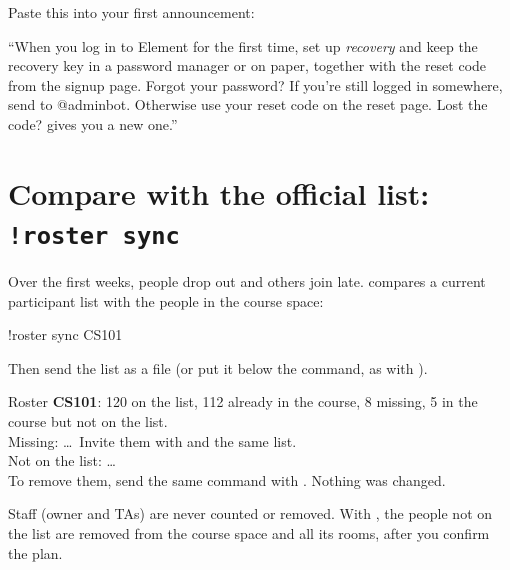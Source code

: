 \begin{tip}
Paste this into your first announcement:\par\smallskip
\enquote{When you log in to Element for the first time, set up \emph{recovery} and keep the
recovery key in a password manager or on paper, together with the reset code from the signup
page. Forgot your password? If you're still logged in somewhere, send  to
@adminbot. Otherwise use your reset code on the reset page. Lost the code?  gives you a new one.}
\end{tip}

\section{Compare with the official list: \texttt{!roster sync}}

Over the first weeks, people drop out and others join late.  compares a
current participant list with the people in the course space:

\begin{you}
!roster sync CS101
\end{you}

Then send the list as a file (or put it below the command, as with ).

\begin{botreply}
Roster \textbf{CS101}: 120 on the list, 112 already in the course, 8 missing, 5 in the course
but not on the list.\\
Missing: \dots\ Invite them with  and the same list.\\
Not on the list: \dots\\
To remove them, send the same command with . Nothing was changed.
\end{botreply}

Staff (owner and TAs) are never counted or removed. With , the people not on
the list are removed from the course space and all its rooms, after you confirm the plan.
